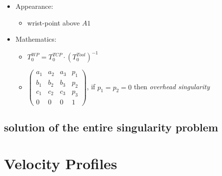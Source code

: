 \documentclass[%
  professionalfonts,%
  xcolor={%
    usenames,%
    dvipsnames,%
    svgnames,%
    table,%
    hyperref%
  }%
]{beamer}
\begin{document}
\begin{frame}
\begin{itemize}
\item Appearance:
  \begin{itemize}
  \item wrist-point above $A1$
  \end{itemize}
\item Mathematics:
  \begin{itemize}
  \item $T_{0}^{WP} = T_{0}^{TCP} \cdot (T_{0}^{Tool})^{-1}$
  \item           
  $\begin{pmatrix}
  a_1 & a_2 & a_3 & p_1 \\
  b_1 & b_2 & b_3 & p_2 \\
  c_1 & c_2 & c_3 & p_3 \\
  0   & 0   & 0   & 1 
  \end{pmatrix}$, 
  if $p_1 = p_2 = 0$ then \emph{overhead singularity}
  \end{itemize}
\end{itemize}  
\end{frame}

\begin{frame}[fragile]

\end{frame}

\subsection{solution of the entire singularity problem}
\begin{frame}[fragile]

\end{frame}


\section{Velocity Profiles}
\end{document}
